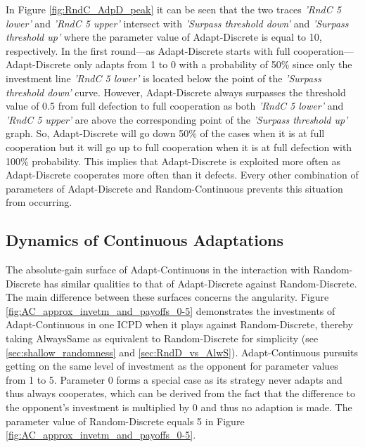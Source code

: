 \documentclass[11pt]{article}
\begin{document}
	\noindent
	In Figure \ref{fig:RndC_AdpD_peak} it can be seen that the two traces \textit{'RndC 5 lower'} and \textit{'RndC 5 upper'} intersect with \textit{'Surpass threshold down'} and \textit{'Surpass threshold up'} where the parameter value of Adapt-Discrete is equal to 10, respectively.
	In the first round---as Adapt-Discrete starts with full cooperation---Adapt-Discrete only adapts from 1 to 0 with a probability of 50\% since only the investment line \textit{'RndC 5 lower'} is located below the point of the \textit{'Surpass threshold down'} curve.
	However, Adapt-Discrete always surpasses the threshold value of 0.5 from full defection to full cooperation as both \textit{'RndC 5 lower'} and \textit{'RndC 5 upper'} are above the corresponding point of the \textit{'Surpass threshold up'} graph.
	So, Adapt-Discrete will go down 50\% of the cases when it is at full cooperation but it will go up to full cooperation when it is at full defection with 100\% probability.
	This implies that Adapt-Discrete is exploited more often as Adapt-Discrete cooperates more often than it defects.
	Every other combination of parameters of Adapt-Discrete and Random-Continuous prevents this situation from occurring.

\subsection{Dynamics of Continuous Adaptations}
	
	The absolute-gain surface of Adapt-Continuous in the interaction with Random-Discrete has similar qualities to that of Adapt-Discrete against Random-Discrete.
	The main difference between these surfaces concerns the angularity.
	Figure \ref{fig:AC_approx_invetm_and_payoffs_0-5} demonstrates the investments of Adapt-Continuous in one ICPD when it plays against Random-Discrete, thereby taking AlwaysSame as equivalent to Random-Discrete for simplicity (see \ref{sec:shallow_randomness} and \ref{sec:RndD_vs_AlwS}).
	Adapt-Continuous pursuits getting on the same level of investment as the opponent for parameter values from 1 to 5.
	Parameter 0 forms a special case as its strategy never adapts and thus always cooperates, which can be derived from the fact that the difference to the opponent's investment is multiplied by 0 and thus no adaption is made.
	The parameter value of Random-Discrete equals 5 in Figure \ref{fig:AC_approx_invetm_and_payoffs_0-5}.
\end{document}
